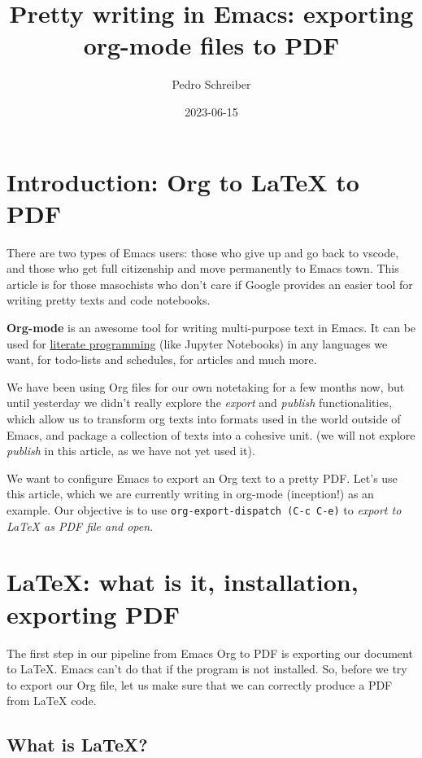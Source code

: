 \documentclass[11pt]{article}
\author{Pedro Schreiber}
\date{2023-06-15}
\title{Pretty writing in Emacs: exporting org-mode files to PDF}
\begin{document}
\maketitle

\section*{Introduction: Org to \LaTeX{} to PDF}
\label{sec:orged82bc8}

There are two types of Emacs users: those who give up and go back to vscode, and those who get
full citizenship and move permanently to Emacs town. This article is for those masochists who don't care
if Google provides an easier tool for writing pretty texts and code notebooks.

\textbf{Org-mode} is an awesome tool for writing multi-purpose text in Emacs. It can be used for
\href{https://en.wikipedia.org/wiki/Literate\_programming}{literate programming} (like Jupyter Notebooks) in any languages we want, for todo-lists and schedules,
for articles and much more.

We have been using Org files for our own notetaking for a few months now, but until yesterday we didn't
really explore the \emph{export} and \emph{publish} functionalities, which allow us to transform org texts into
formats used in the world outside of Emacs, and package a collection of texts into a cohesive unit.
(we will not explore \emph{publish} in this article, as we have not yet used it).

We want to configure Emacs to export an Org text to a pretty PDF. Let's use this article, which we are
currently writing in org-mode (inception!) as an example. Our objective is to use \texttt{org-export-dispatch (C-c C-e)}
to \emph{export to \LaTeX{} as PDF file and open}.

\section*{\LaTeX{}: what is it, installation, exporting PDF}
\label{sec:org0e2f3d0}

The first step in our pipeline from Emacs Org to PDF is exporting our document to \LaTeX{}. Emacs can't do that
if the program is not installed. So, before we try to export our Org file, let us make sure that we can correctly
produce a PDF from \LaTeX{} code.

\subsection*{What is \LaTeX{}?}
\label{sec:orgdb3ca2c}
\end{document}
